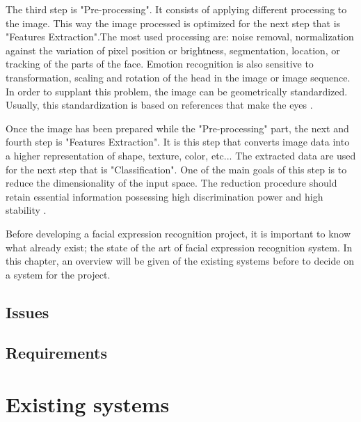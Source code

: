 \noindent The third step is "Pre-processing". It consists of applying different processing to the image. This way the image processed is optimized for the next step that is "Features Extraction".The most used processing are: noise removal, normalization against the variation of pixel position or brightness, segmentation, location, or tracking of the parts of the face. Emotion recognition is also sensitive to transformation, scaling and rotation of the head in the image or image sequence. In order to supplant this problem, the image can be geometrically standardized. Usually, this standardization is based on references that make the eyes \cite{CHI03}.
\newline

\noindent Once the image has been prepared while the "Pre-processing" part, the next and fourth step is "Features Extraction". It is this step that converts image data into a higher representation of shape, texture, color, etc... The extracted data are used for the next step that is "Classification". One of the main goals of this step is to reduce the dimensionality of the input space. The reduction procedure should retain essential information possessing high discrimination power and high stability \cite{CHI03}.
\newline

\noindent Before developing a facial expression recognition project, it is important to know what already exist; the state of the art of facial expression recognition system. In this chapter, an overview will be given of the existing systems before to decide on a system for the project.
\newline

\section{Issues}


\section{Requirements}

\chapter{Existing systems}



